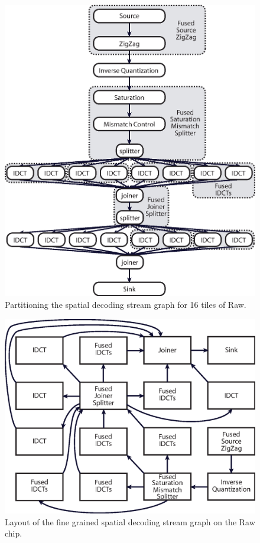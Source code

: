 \begin{figure}[p]
  \begin{center}
    \includegraphics[scale=0.5, angle=0]{./partition.eps}
    \caption{Partitioning the spatial decoding stream graph for 16 tiles of Raw.}
    \label{fig:partition}
  \end{center}
\end{figure}

\begin{figure}[p]
  \begin{center}
    \includegraphics[scale=0.5, angle=0]{./layout.eps}
    \caption{Layout of the fine grained spatial decoding stream graph on the Raw chip.}
    \label{fig:layout}
  \end{center}
\end{figure}

